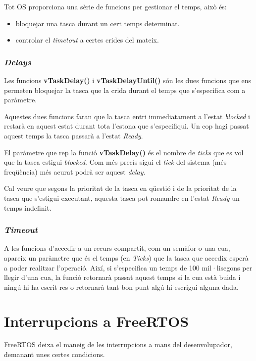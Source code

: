 Tot OS proporciona una sèrie de funcions per gestionar el temps, això és:
\begin{itemize}
 \item bloquejar una tasca durant un cert temps determinat.
 \item controlar el {\em timetout} a certes crides del mateix.
\end{itemize}

\subsubsection{\em Delays}
Les funcions {\bf vTaskDelay()} i {\bf vTaskDelayUntil()} són les dues funcions que ens permeten bloquejar la tasca que la crida durant el temps que s'especifica com a paràmetre.

Aquestes dues funcions faran que la tasca entri immediatament a l'estat {\em blocked} i restarà en aquest estat durant tota l'estona que s'especifiqui. Un cop hagi passat aquest temps la tasca passarà a l'estat {\em Ready}.

El paràmetre que rep la funció {\bf vTaskDelay()} és el nombre de {\em ticks} que es vol que la tasca estigui {\em blocked}. Com més precís sigui el {\em tick} del sistema (més freqüència) més acurat podrà ser aquest {\em delay}.

Cal veure que segons la prioritat de la tasca en qüestió i de la prioritat de la tasca que s'estigui executant, aquesta tasca pot romandre en l'estat {\em Ready} un temps indefinit.

\subsubsection{\em Timeout}
A les funcions d'accedir a un recurs compartit, com un semàfor o una cua, apareix un paràmetre que és el temps (en {\em Ticks}) que la tasca que accedix esperà a poder realitzar l'operació. Així, si s'especifica un temps de 100 mil·lisegons per llegir d'una cua, la funció retornarà passat aquest temps si la cua està buida i ningú hi ha escrit res o retornarà tant bon punt algú hi escrigui alguna dada.

\section{Interrupcions a FreeRTOS}
\label{ch:FreeRTOSIRQ}

FreeRTOS deixa el maneig de les interrupcions a mans del desenvolupador, demanant unes certes condicions.

